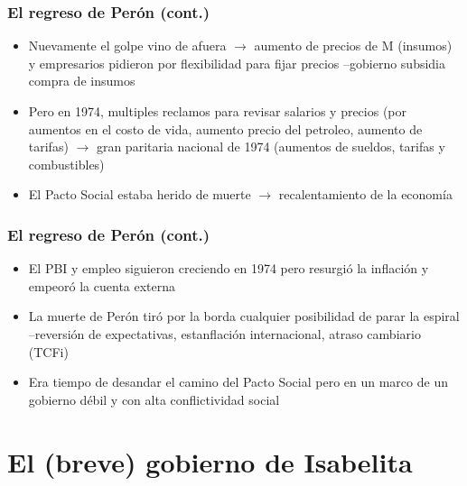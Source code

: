 \documentclass[14pt,aspectratio=169]{beamer}
\begin{document}
               

\begin{frame}\frametitle{El regreso de Perón (cont.)}
                 \begin{itemize}\itemsep 5pt \medskip
                 \item Nuevamente el golpe vino de afuera
                   $\longrightarrow$ aumento de precios de M (insumos)
                   y empresarios pidieron por flexibilidad para fijar
                   precios --gobierno subsidia compra de insumos
                   \item Pero en 1974, multiples reclamos para revisar
                     salarios y precios (por aumentos en el costo de
                     vida, aumento precio del petroleo, aumento de
                     tarifas) $\longrightarrow$ gran paritaria
                     nacional de 1974 (aumentos de sueldos, tarifas y
                     combustibles)
                     \item El Pacto Social estaba herido de muerte
                       $\longrightarrow$ recalentamiento de la economía
                 \end{itemize}
               \end{frame}


               \begin{frame}\frametitle{El regreso de Perón (cont.)}
                 \begin{itemize}\itemsep 5pt \medskip
                 \item El PBI y empleo siguieron creciendo en 1974
                   pero resurgió la inflación y empeoró la cuenta
                   externa
                    \item La muerte de Perón tiró por la borda
                      cualquier posibilidad de parar la espiral
                      --reversión de expectativas, estanflación
                      internacional, atraso cambiario (TCFi)
                      \item Era tiempo de desandar el camino del Pacto
                        Social pero en un marco de un gobierno débil y
                        con alta conflictividad social
                 \end{itemize}
               \end{frame}
               

  
\section{El (breve) gobierno de Isabelita}
\end{document}

